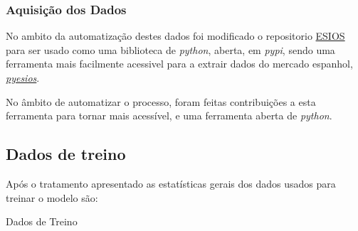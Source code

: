 \subsubsection{Aquisição dos Dados}
\text{ }  \par

No ambito da automatização destes dados foi modificado o repositorio \href{https://github.com/SanPen/\gls{ESIOS}}{\gls{ESIOS}} para ser usado como uma biblioteca de \textit{python}, aberta, em \textit{pypi}, sendo uma ferramenta mais facilmente acessivel para a extrair dados do mercado espanhol, \href{https://pypi.org/project/pyesios/}{\textit{pyesios}}.\par
No âmbito de automatizar o processo, foram feitas contribuições a esta ferramenta para tornar mais acessível, e uma ferramenta aberta de \textit{python}.\par


\thispagestyle{plain}
 \label{se:dadoscrus}



\thispagestyle{plain}
 \label{se:tratamentodados}

\subsection{Dados de treino}

Após o tratamento apresentado as estatísticas gerais dos dados usados para treinar o modelo são:

\begin{table}[H]
    \centering
    \caption{Dados de Treino}    
    \resizebox{\linewidth}{!}{}
    \end{table}


\thispagestyle{plain}
 \label{se:val_data}
